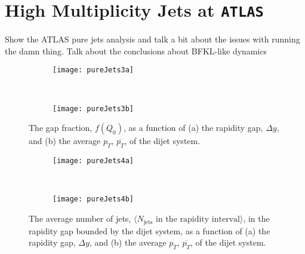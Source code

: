 \chapter{High Multiplicity Jets at \texttt{ATLAS}}
\label{chap:ATLAS}

	Show the ATLAS pure jets analysis and talk a bit about the issues with running the damn thing.  Talk about the conclusions about BFKL-like dynamics

	\begin{figure}[H]
		\centering
		\begin{subfigure}[b]{0.48\textwidth}
			\texttt{[image: pureJets3a]}
			\caption{}
			\label{fig:}
		\end{subfigure}
		~
		\begin{subfigure}[b]{0.48\textwidth}
			\texttt{[image: pureJets3b]}
			\caption{}
			\label{fig:}
		\end{subfigure}
		\caption{The gap fraction, $f(Q_0)$, as a function of (a) the rapidity gap, $\Delta y$, and (b) the average $p_T$, $\overline{p_T}$, of the dijet system.}
		\label{fig:}

		\begin{subfigure}[b]{0.48\textwidth}
			\texttt{[image: pureJets4a]}
			\caption{}
			\label{fig:}
		\end{subfigure}
		~
		\begin{subfigure}[b]{0.48\textwidth}
			\texttt{[image: pureJets4b]}
			\caption{}
			\label{fig:}
		\end{subfigure}
		\caption{The average number of jets, $\langle N_{\text{jets}} \text{ in the rapidity interval}\rangle$, in the rapidity gap
		         bounded by the dijet system, as a function of (a) the rapidity gap, $\Delta y$, and (b) the average $p_T$, $\overline{p_T}$,
		         of the dijet system.}
		\label{fig:}
	\end{figure}

